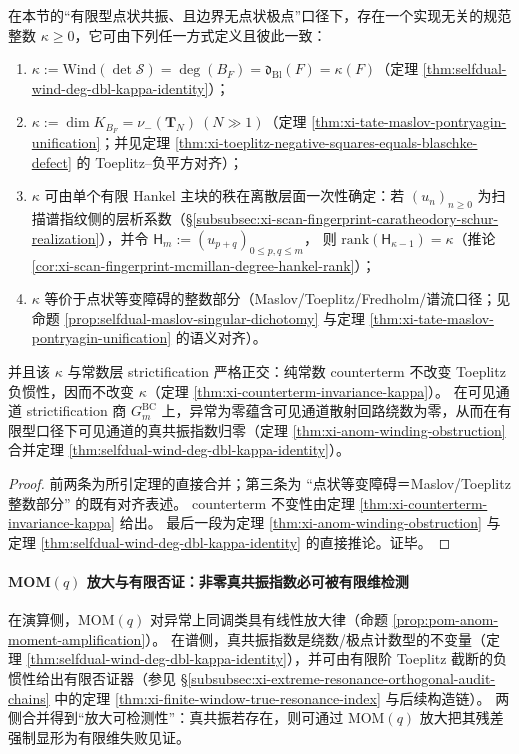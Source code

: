 \begin{corollary}\label{cor:xi-kappa-invariant-unification}
在本节的“有限型点状共振、且边界无点状极点”口径下，存在一个实现无关的规范整数 \(\kappa\ge 0\)，它可由下列任一方式定义且彼此一致：
\begin{enumerate}
  \item \(\kappa:=\mathrm{Wind}(\det\mathcal S)=\deg(B_F)=\mathfrak d_{\mathrm{Bl}}(F)=\kappa(F)\)（定理 \ref{thm:selfdual-wind-deg-dbl-kappa-identity}）；
  \item \(\kappa:=\dim K_{B_F}=\nu_-(\mathbf{T}_N)\ (N\gg 1)\)（定理 \ref{thm:xi-tate-maslov-pontryagin-unification}；并见定理 \ref{thm:xi-toeplitz-negative-squares-equals-blaschke-defect} 的 Toeplitz--负平方对齐）；
  \item \(\kappa\) 可由单个有限 Hankel 主块的秩在离散层面一次性确定：若 \((u_n)_{n\ge 0}\) 为扫描谱指纹侧的层析系数（\S\ref{subsubsec:xi-scan-fingerprint-caratheodory-schur-realization}），并令
  \(\mathsf{H}_m:=(u_{p+q})_{0\le p,q\le m}\)，
  则 \(\mathrm{rank}(\mathsf{H}_{\kappa-1})=\kappa\)（推论 \ref{cor:xi-scan-fingerprint-mcmillan-degree-hankel-rank}）；
  \item \(\kappa\) 等价于点状等变障碍的整数部分（Maslov/Toeplitz/Fredholm/谱流口径；见命题 \ref{prop:selfdual-maslov-singular-dichotomy} 与定理 \ref{thm:xi-tate-maslov-pontryagin-unification} 的语义对齐）。
\end{enumerate}
并且该 \(\kappa\) 与常数层 strictification 严格正交：纯常数 counterterm 不改变 Toeplitz 负惯性，因而不改变 \(\kappa\)（定理 \ref{thm:xi-counterterm-invariance-kappa}）。
在可见通道 strictification 商 \(G^{\mathrm{BC}}_m\) 上，异常为零蕴含可见通道散射回路绕数为零，从而在有限型口径下可见通道的真共振指数归零（定理 \ref{thm:xi-anom-winding-obstruction} 合并定理 \ref{thm:selfdual-wind-deg-dbl-kappa-identity}）。
\end{corollary}
\begin{proof}
前两条为所引定理的直接合并；第三条为 “点状等变障碍＝Maslov/Toeplitz 整数部分” 的既有对齐表述。
counterterm 不变性由定理 \ref{thm:xi-counterterm-invariance-kappa} 给出。
最后一段为定理 \ref{thm:xi-anom-winding-obstruction} 与定理 \ref{thm:selfdual-wind-deg-dbl-kappa-identity} 的直接推论。证毕。
\end{proof}

\paragraph{MOM\texorpdfstring{$(q)$}{(q)} 放大与有限否证：非零真共振指数必可被有限维检测}
在演算侧，MOM\((q)\) 对异常上同调类具有线性放大律（命题 \ref{prop:pom-anom-moment-amplification}）。
在谱侧，真共振指数是绕数/极点计数型的不变量（定理 \ref{thm:selfdual-wind-deg-dbl-kappa-identity}），并可由有限阶 Toeplitz 截断的负惯性给出有限否证器（参见 \S\ref{subsubsec:xi-extreme-resonance-orthogonal-audit-chains} 中的定理 \ref{thm:xi-finite-window-true-resonance-index} 与后续构造链）。
两侧合并得到“放大可检测性”：真共振若存在，则可通过 MOM\((q)\) 放大把其残差强制显形为有限维失败见证。

